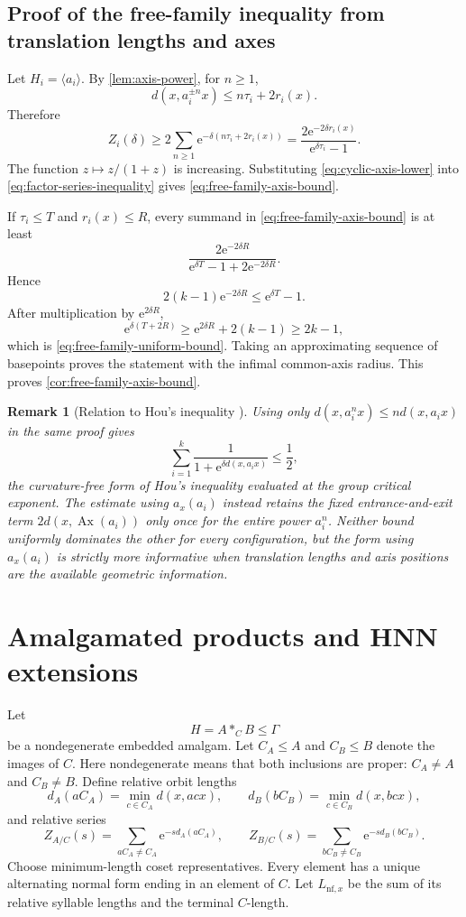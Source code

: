 \documentclass[11pt]{article}
\newtheorem{remark}[remark]{Remark}
\theoremstyle{definition}
\newcommand{\Ax}{\operatorname{Ax}}
\newcommand{\e}{\mathrm e}
\begin{document}
\subsection{Proof of the free-family inequality from translation lengths and axes}
Let $H_i=\langle a_i\rangle$.  By \cref{lem:axis-power}, for $n\ge1$,
\[
 d(x,a_i^{\pm n}x)\le n\tau_i+2r_i(x).
\]
Therefore
\begin{equation}\label{eq:cyclic-axis-lower}
 Z_i(\delta)
 \ge2\sum_{n\ge1}\e^{-\delta(n\tau_i+2r_i(x))}
 =\frac{2\e^{-2\delta r_i(x)}}{\e^{\delta\tau_i}-1}.
\end{equation}
The function $z\mapsto z/(1+z)$ is increasing.  Substituting
\eqref{eq:cyclic-axis-lower} into \eqref{eq:factor-series-inequality} gives
\eqref{eq:free-family-axis-bound}.

If $\tau_i\le T$ and $r_i(x)\le R$, every summand in
\eqref{eq:free-family-axis-bound} is at least
\[
 \frac{2\e^{-2\delta R}}
 {\e^{\delta T}-1+2\e^{-2\delta R}}.
\]
Hence
\[
 2(k-1)\e^{-2\delta R}\le\e^{\delta T}-1.
\]
After multiplication by $\e^{2\delta R}$,
\[
 \e^{\delta(T+2R)}\ge\e^{2\delta R}+2(k-1)\ge2k-1,
\]
which is \eqref{eq:free-family-uniform-bound}.  Taking an approximating sequence of basepoints proves
the statement with the infimal common-axis radius.  This proves
\cref{cor:free-family-axis-bound}.

\begin{remark}[Relation to Hou's inequality \cite{Hou2001}]
Using only $d(x,a_i^n x)\le n d(x,a_ix)$ in the same proof gives
\[
 \sum_{i=1}^k\frac{1}{1+\e^{\delta d(x,a_ix)}}\le\frac12,
\]
the curvature-free form of Hou's inequality evaluated at the group critical exponent.  The estimate using $a_x(a_i)$ instead retains the
fixed entrance-and-exit term $2d(x,\Ax(a_i))$ only once for the entire power $a_i^n$.
Neither bound uniformly dominates the other for every configuration, but the form using $a_x(a_i)$ is
strictly more informative when translation lengths and axis positions are the available
geometric information.
\end{remark}

\section{Amalgamated products and HNN extensions}
\label{sec:amalgams}

Let
\[
 H=A*_CB\le\Gamma
\]
be a nondegenerate embedded amalgam.  Let $C_A\le A$ and $C_B\le B$ denote the images of
$C$.  Here nondegenerate means that both inclusions are proper: $C_A\ne A$ and $C_B\ne B$.
Define relative orbit lengths
\[
 d_A(aC_A)=\min_{c\in C_A}d(x,acx),
 \qquad
 d_B(bC_B)=\min_{c\in C_B}d(x,bcx),
\]
and relative series
\begin{equation}\label{eq:amalgam-relative-series}
 Z_{A/C}(s)=\sum_{aC_A\ne C_A}\e^{-sd_A(aC_A)},
 \qquad
 Z_{B/C}(s)=\sum_{bC_B\ne C_B}\e^{-sd_B(bC_B)}.
\end{equation}
Choose minimum-length coset representatives.  Every element has a unique alternating normal
form ending in an element of $C$. Let $L_{\mathrm{nf},x}$ be the sum of its relative syllable
lengths and the terminal $C$-length.
\end{document}

